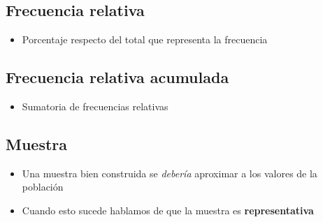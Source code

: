 \subsection{Frecuencia relativa}
\begin{itemize}
    \item Porcentaje respecto del total que representa la frecuencia
\end{itemize}

\subsection{Frecuencia relativa acumulada}
\begin{itemize}
    \item Sumatoria de frecuencias relativas
\end{itemize}

\subsection{Muestra}
\begin{itemize}
    \item Una muestra bien construida se \textit{debería} aproximar a los valores 
    de la población 
    \item Cuando esto sucede hablamos de que la muestra es \textbf{representativa}
\end{itemize}
